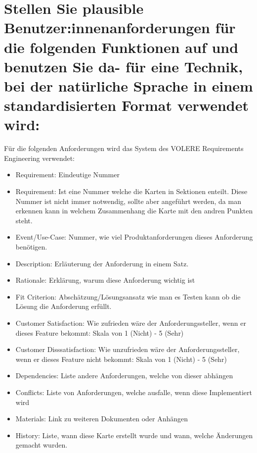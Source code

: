 \documentclass[12pt]{article}
\begin{document}
\section{Stellen Sie plausible Benutzer:innenanforderungen für die folgenden Funktionen auf und benutzen Sie da-
für eine Technik, bei der natürliche Sprache in einem standardisierten Format verwendet wird:}
Für die folgenden Anforderungen wird das System des VOLERE Requirements Engineering verwendet:
\begin{itemize}
 \item Requirement: Eindeutige Nummer
 \item Requirement: Ist eine Nummer welche die Karten in Sektionen enteilt. Diese Nummer ist nicht immer notwendig, sollte aber angeführt werden, da man erkennen kann in welchem Zusammenhang die Karte mit den andren Punkten steht.
 \item Event/Use-Case: Nummer, wie viel Produktanforderungen dieses Anforderung benötigen.
 \item Description: Erläuterung der Anforderung in einem Satz.
 \item Rationale: Erklärung, warum diese Anforderung wichtig ist
 \item Fit Criterion: Abschätzung/Lösungsansatz wie man es Testen kann ob die Lösung die Anforderung erfüllt.
 \item Customer Satisfaction: Wie zufrieden wäre der Anforderungssteller, wenn er dieses Feature bekommt: Skala von 1 (Nicht) - 5 (Sehr)
 \item Customer Disssatisfaction: Wie unzufrieden wäre der Anforderungssteller, wenn er dieses Feature nicht bekommt: Skala von 1 (Nicht) - 5 (Sehr)
 \item Dependencies: Liste andere Anforderungen, welche von dieser abhängen
 \item Conflicts: Liste von Anforderungen, welche ausfalle, wenn diese Implementiert wird
 \item Materials: Link zu weiteren Dokumenten oder Anhängen
 \item History: Liste, wann diese Karte erstellt wurde und wann, welche Änderungen gemacht wurden.
\end{itemize}
\cite{volere}
\pagebreak
\end{document}
